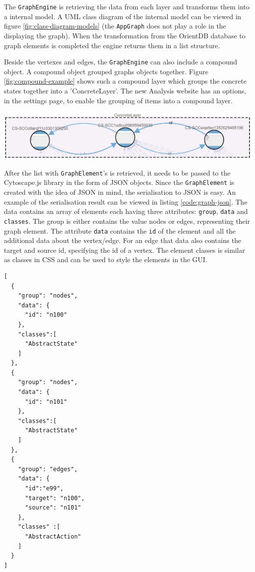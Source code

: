 The \verb|GraphEngine| is retrieving the data from each layer and transforms them into a internal model. A UML class diagram of the internal model can be viewed in figure \ref{fig:class-diagram-models} (the \verb|AppGraph| does not play a role in the displaying the graph). When the transformation from the OrientDB database to graph elements is completed the engine returns them in a list structure. 

Beside the vertexes and edges, the \verb|GraphEngine| can also include a compound object. A compound object grouped graphs objects together. Figure \ref{fig:compound-example} shows such a compound layer which groups the concrete states together into a 'ConcreteLayer'. The new Analysis website has an options, in the settings page, to enable the grouping of items into a compound layer.

\begingroup
\captionsetup{type=figure}
\includegraphics[scale=0.6]{content/5-Results/Images/compound-layer.png}
\label{fig:compound-example}
\endgroup

After the list with \verb|GraphElement|'s is retrieved, it needs to be passed to the Cytoscape.js library in the form of JSON objects. Since the \verb|GraphElement| is created with the idea of JSON in mind, the serialisation to JSON is easy. An example of the serialisation result can be viewed in listing \ref{code:graph-json}. The data contains an array of elements each having three attributes: \verb|group|, \verb|data| and \verb|classes|. The group is either contains the value nodes or edges, representing their graph element. The attribute \verb|data| contains the \verb|id| of the element and all the additional data about the vertex/edge. For an edge that data also contains the target and source id, specifying the id of a vertex. The element classes is similar as classes in \textsc{CSS} and can be used to style the elements in the GUI. 

\begin{lstlisting}[language=xml, caption=Graph representation in JSON, label=code:graph-json]
[
  {
    "group": "nodes",
    "data": {
      "id": "n100" 
    },
    "classes":[
      "AbstractState"
    ]
  },
  {
    "group": "nodes",
    "data": {
      "id": "n101"
    },
    "classes":[
      "AbstractState"
    ]
  },
  {
    "group": "edges",
    "data": {
      "id":"e99",
      "target": "n100",
      "source": "n101"
    },
    "classes" :[
      "AbstractAction"
    ]
  }
]
\end{lstlisting}

